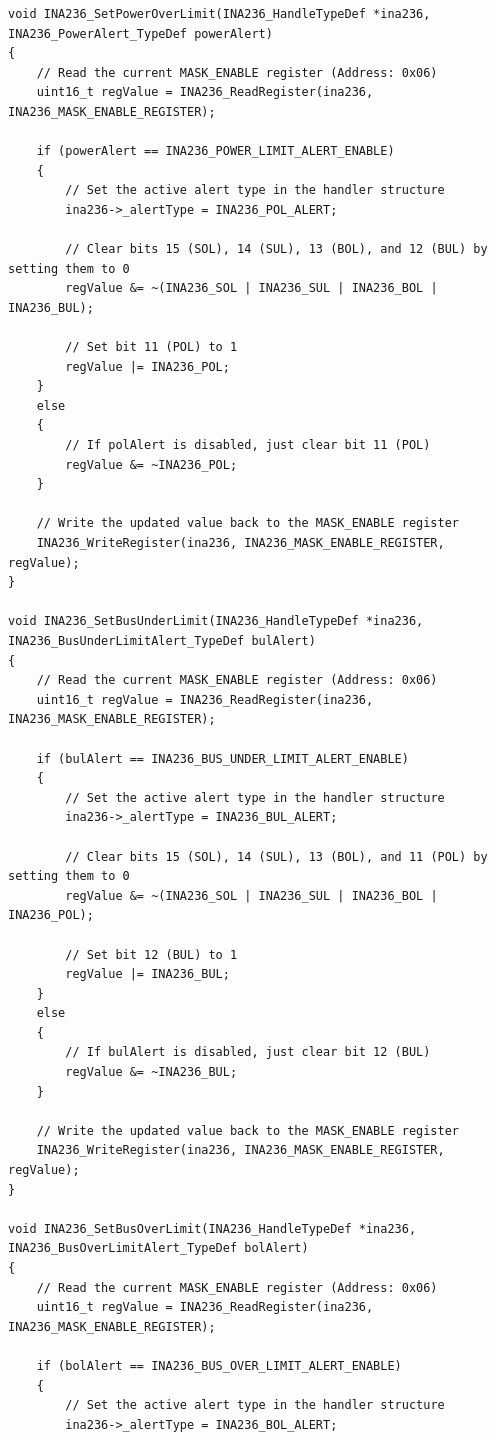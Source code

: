 \documentclass[
10pt, %
a4paper, %
oneside, %
headinclude,footinclude, %
BCOR5mm, %
]{scrartcl}
\begin{document}
\begin{lstlisting}[style=CMakeStyle]
void INA236_SetPowerOverLimit(INA236_HandleTypeDef *ina236, INA236_PowerAlert_TypeDef powerAlert)
{
    // Read the current MASK_ENABLE register (Address: 0x06)
    uint16_t regValue = INA236_ReadRegister(ina236, INA236_MASK_ENABLE_REGISTER);

    if (powerAlert == INA236_POWER_LIMIT_ALERT_ENABLE)
    {
        // Set the active alert type in the handler structure
        ina236->_alertType = INA236_POL_ALERT;

        // Clear bits 15 (SOL), 14 (SUL), 13 (BOL), and 12 (BUL) by setting them to 0
        regValue &= ~(INA236_SOL | INA236_SUL | INA236_BOL | INA236_BUL);

        // Set bit 11 (POL) to 1
        regValue |= INA236_POL;
    }
    else
    {
        // If polAlert is disabled, just clear bit 11 (POL)
        regValue &= ~INA236_POL;
    }

    // Write the updated value back to the MASK_ENABLE register
    INA236_WriteRegister(ina236, INA236_MASK_ENABLE_REGISTER, regValue);
}

void INA236_SetBusUnderLimit(INA236_HandleTypeDef *ina236, INA236_BusUnderLimitAlert_TypeDef bulAlert)
{
    // Read the current MASK_ENABLE register (Address: 0x06)
    uint16_t regValue = INA236_ReadRegister(ina236, INA236_MASK_ENABLE_REGISTER);

    if (bulAlert == INA236_BUS_UNDER_LIMIT_ALERT_ENABLE)
    {
        // Set the active alert type in the handler structure
        ina236->_alertType = INA236_BUL_ALERT;

        // Clear bits 15 (SOL), 14 (SUL), 13 (BOL), and 11 (POL) by setting them to 0
        regValue &= ~(INA236_SOL | INA236_SUL | INA236_BOL | INA236_POL);

        // Set bit 12 (BUL) to 1
        regValue |= INA236_BUL;
    }
    else
    {
        // If bulAlert is disabled, just clear bit 12 (BUL)
        regValue &= ~INA236_BUL;
    }

    // Write the updated value back to the MASK_ENABLE register
    INA236_WriteRegister(ina236, INA236_MASK_ENABLE_REGISTER, regValue);
}

void INA236_SetBusOverLimit(INA236_HandleTypeDef *ina236, INA236_BusOverLimitAlert_TypeDef bolAlert)
{
    // Read the current MASK_ENABLE register (Address: 0x06)
    uint16_t regValue = INA236_ReadRegister(ina236, INA236_MASK_ENABLE_REGISTER);

    if (bolAlert == INA236_BUS_OVER_LIMIT_ALERT_ENABLE)
    {
        // Set the active alert type in the handler structure
        ina236->_alertType = INA236_BOL_ALERT;


\end{lstlisting}
\end{document}
